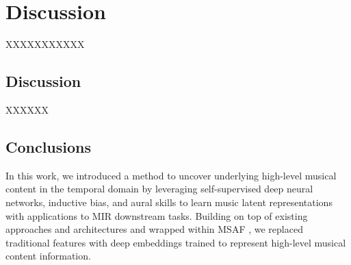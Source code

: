 \chapter{Discussion}

XXXXXXXXXXX

\section{Discussion}

XXXXXX

\section{Conclusions}

In this work, we introduced a method to uncover underlying high-level musical
content in the temporal domain by leveraging self-supervised deep neural networks, inductive bias, and aural skills to learn music latent representations with applications to MIR downstream tasks. Building on top of existing approaches and architectures and wrapped within MSAF \cite{NietoMSAF:FRAMEWORK}, we replaced traditional features with deep embeddings trained to represent high-level musical content information.


\newpage


